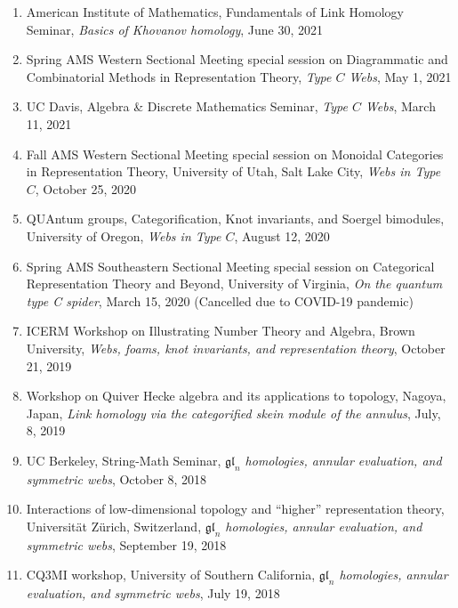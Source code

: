 \documentclass[10pt]{article}
\begin{document}
\begin{enumerate}
\item American Institute of Mathematics, Fundamentals of Link Homology Seminar,
\emph{Basics of Khovanov homology},
June 30, 2021

\item Spring AMS Western Sectional Meeting 
special session on Diagrammatic and Combinatorial Methods in Representation Theory, 
\emph{Type $C$ Webs},
May 1, 2021

\item UC Davis, Algebra \& Discrete Mathematics Seminar,
\emph{Type $C$ Webs},
March 11, 2021

\item Fall AMS Western Sectional Meeting 
special session on Monoidal Categories in Representation Theory, 
University of Utah, Salt Lake City, 
\emph{Webs in Type $C$},
October 25, 2020

\item QUAntum groups, Categorification, Knot invariants, and Soergel bimodules,
University of Oregon,
\emph{Webs in Type $C$},
August 12, 2020

\item Spring AMS Southeastern Sectional Meeting 
special session on Categorical Representation Theory and Beyond, 
University of Virginia,
\emph{On the quantum type C spider},
March 15, 2020 (Cancelled due to COVID-19 pandemic)

\item ICERM Workshop on Illustrating Number Theory and Algebra, 
Brown University, 
\emph{Webs, foams, knot invariants, and representation theory},
October 21, 2019

\item Workshop on Quiver Hecke algebra and its applications to topology, 
Nagoya, Japan, 
\emph{Link homology via the categorified skein module of the annulus},
July, 8, 2019

\item UC Berkeley, String-Math Seminar,
\emph{$\mathfrak{gl}_n$ homologies, annular evaluation, and symmetric webs},
October 8, 2018

\item Interactions of low-dimensional topology and ``higher'' representation theory,
Universit\"{a}t Z\"{u}rich, Switzerland,
\emph{$\mathfrak{gl}_n$ homologies, annular evaluation, and symmetric webs},
September 19, 2018

\item CQ3MI workshop,
University of Southern California, 
\emph{$\mathfrak{gl}_n$ homologies, annular evaluation, and symmetric webs},
July 19, 2018


\end{enumerate}
\end{document}
